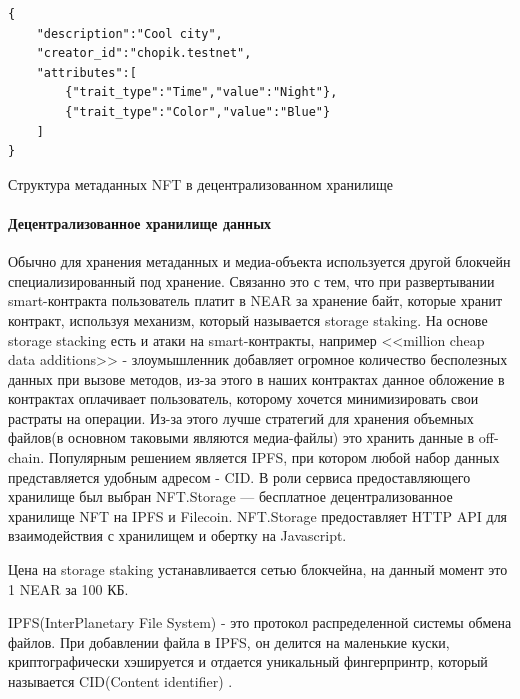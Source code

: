 \begin{listing}
\begin{verbatim}
{
    "description":"Cool city",
    "creator_id":"chopik.testnet",
    "attributes":[
        {"trait_type":"Time","value":"Night"},
        {"trait_type":"Color","value":"Blue"}
    ]
}
\end{verbatim}
\caption{Структура метаданных NFT в децентрализованном хранилище}
\label{lst.nftmetadata}
\end{listing}

\paragraph{Децентрализованное хранилище данных}
\label{section.main.bot.storage}

Обычно для хранения метаданных и медиа-объекта используется другой блокчейн специализированный под хранение. Связанно это с тем, что при развертывании smart-контракта пользователь платит в NEAR за хранение байт, которые хранит контракт, используя механизм, который называется storage staking. На основе storage stacking есть и атаки на smart-контракты, например <<million cheap data additions>> - злоумышленник добавляет огромное количество бесполезных данных при вызове методов, из-за этого в наших контрактах данное обложение в контрактах оплачивает пользователь, которому хочется минимизировать свои растраты на операции. Из-за этого лучше стратегий для хранения объемных файлов(в основном таковыми являются медиа-файлы) это хранить данные в off-chain. Популярным решением является IPFS, при котором любой набор данных представляется удобным адресом - CID. В роли сервиса предоставляющего хранилище был выбран NFT.Storage\cite{nftstorage} --- бесплатное децентрализованное хранилище NFT на IPFS\cite{ipfs} и Filecoin\cite{filecoin}. NFT.Storage предоставляет HTTP API для взаимодействия с хранилищем и обертку на Javascript.

\begin{remark}
    Цена на storage staking устанавливается сетью блокчейна, на данный момент это 1 NEAR за 100 КБ.
\end{remark}

\begin{definition}
    IPFS(InterPlanetary File System) - это протокол распределенной системы обмена файлов. При добавлении файла в IPFS, он делится на маленькие куски, криптографически хэшируется и отдается уникальный фингерпринтр, который называется CID(Content identifier) \cite{ipfs}.
\end{definition}

